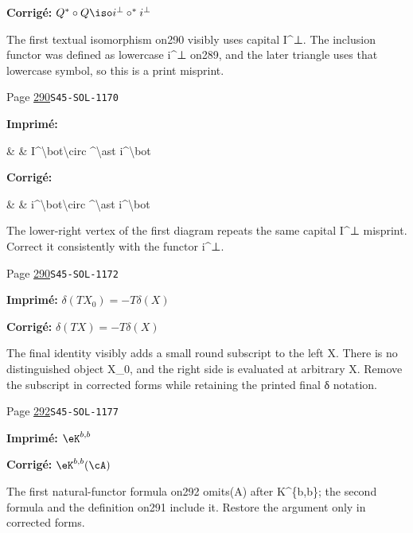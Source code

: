 \begin{description}
\par\noindent\textbf{Corrigé:} \(Q^\ast\circ Q\iso i^\bot\circ ^\ast i^\bot\)
\par\noindent The first textual isomorphism on290 visibly uses capital I\textasciicircum{}⊥. The inclusion functor was defined as lowercase i\textasciicircum{}⊥ on289, and the later triangle uses that lowercase symbol, so this is a print misprint.
\smallskip
\item[\hypertarget{apparatus:FR-0291}{291}] Page \hyperlink{printpage:fr:290}{290}\quad\texttt{S45-SOL-1170}
\par\noindent\textbf{Imprimé:} {\footnotesize\ttfamily\raggedright \& \& I\textasciicircum{}\allowbreak{}\textbackslash{}\allowbreak{}bot\textbackslash{}\allowbreak{}circ \textasciicircum{}\allowbreak{}\textbackslash{}\allowbreak{}ast i\textasciicircum{}\allowbreak{}\textbackslash{}\allowbreak{}bot}
\par\noindent\textbf{Corrigé:} {\footnotesize\ttfamily\raggedright \& \& i\textasciicircum{}\allowbreak{}\textbackslash{}\allowbreak{}bot\textbackslash{}\allowbreak{}circ \textasciicircum{}\allowbreak{}\textbackslash{}\allowbreak{}ast i\textasciicircum{}\allowbreak{}\textbackslash{}\allowbreak{}bot}
\par\noindent The lower-right vertex of the first diagram repeats the same capital I\textasciicircum{}⊥ misprint. Correct it consistently with the functor i\textasciicircum{}⊥.
\smallskip
\item[\hypertarget{apparatus:FR-0292}{292}] Page \hyperlink{printpage:fr:290}{290}\quad\texttt{S45-SOL-1172}
\par\noindent\textbf{Imprimé:} \(\delta(T X_0) = - T \delta(X)\)
\par\noindent\textbf{Corrigé:} \(\delta(T X) = - T \delta(X)\)
\par\noindent The final identity visibly adds a small round subscript to the left X. There is no distinguished object X\_0, and the right side is evaluated at arbitrary X. Remove the subscript in corrected forms while retaining the printed final δ notation.
\smallskip
\item[\hypertarget{apparatus:FR-0293}{293}] Page \hyperlink{printpage:fr:292}{292}\quad\texttt{S45-SOL-1177}
\par\noindent\textbf{Imprimé:} \(\eK^{b,b}\)
\par\noindent\textbf{Corrigé:} \(\eK^{b,b}(\cA)\)
\par\noindent The first natural-functor formula on292 omits(A) after K\textasciicircum{}\{b,b\}; the second formula and the definition on291 include it. Restore the argument only in corrected forms.

\end{description}
